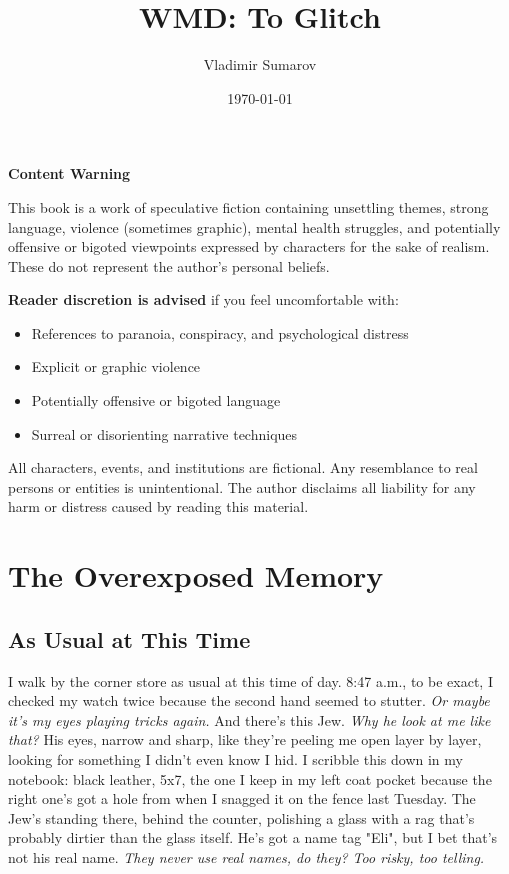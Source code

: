 \documentclass[12pt,oneside]{book}
\title{\color{black}WMD: To Glitch}
\author{\color{gray}Vladimir Sumarov}
\date{\today}
\begin{document}
\maketitle
\clearpage %
\begin{mdframed}[linewidth=2pt,linecolor=black]
\begin{center}
    {\Large \bfseries Content Warning}
\end{center}
This book is a work of speculative fiction containing unsettling themes,
strong language, violence (sometimes graphic), mental health struggles,
and potentially offensive or bigoted viewpoints expressed by characters
for the sake of realism. These do not represent the author’s personal beliefs.

\textbf{Reader discretion is advised} if you feel uncomfortable with:
\begin{itemize}
    \item References to paranoia, conspiracy, and psychological distress
    \item Explicit or graphic violence
    \item Potentially offensive or bigoted language
    \item Surreal or disorienting narrative techniques
\end{itemize}
All characters, events, and institutions are fictional. Any resemblance
to real persons or entities is unintentional. The author disclaims all
liability for any harm or distress caused by reading this material.
\end{mdframed}
\clearpage %
\tableofcontents
\clearpage %
\part{The Overexposed Memory}

\chapter{As Usual at This Time}

I walk by the corner store as usual at this time of day. 8:47 a.m., to be exact, I checked my watch twice because the second hand seemed to stutter. \textit{Or maybe it’s my eyes playing tricks again.} And there’s this Jew. \textit{Why he look at me like that?} His eyes, narrow and sharp, like they’re peeling me open layer by layer, looking for something I didn’t even know I hid. I scribble this down in my notebook: black leather, 5x7, the one I keep in my left coat pocket because the right one’s got a hole from when I snagged it on the fence last Tuesday. The Jew’s standing there, behind the counter, polishing a glass with a rag that’s probably dirtier than the glass itself. He’s got a name tag \textnormal{"Eli"}, but I bet that’s not his real name. \textit{They never use real names, do they? Too risky, too telling.}
\end{document}
